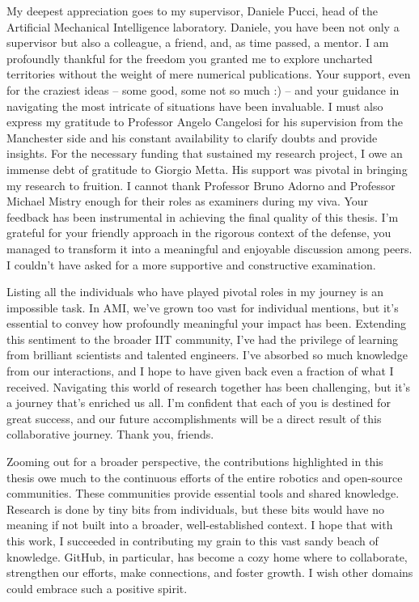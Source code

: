 \begin{addmargin}{-1.0cm}
My deepest appreciation goes to my supervisor, Daniele Pucci, head of the Artificial Mechanical Intelligence laboratory.
Daniele, you have been not only a supervisor but also a colleague, a friend, and, as time passed, a mentor.
I am profoundly thankful for the freedom you granted me to explore uncharted territories without the weight of mere numerical publications.
Your support, even for the craziest ideas -- some good, some not so much :) -- and your guidance in navigating the most intricate of situations have been invaluable.
I must also express my gratitude to Professor Angelo Cangelosi for his supervision from the Manchester side and his constant availability to clarify doubts and provide insights.
For the necessary funding that sustained my research project, I owe an immense debt of gratitude to Giorgio Metta.
His support was pivotal in bringing my research to fruition.
I cannot thank Professor Bruno Adorno and Professor Michael Mistry enough for their roles as examiners during my viva.
Your feedback has been instrumental in achieving the final quality of this thesis.
I'm grateful for your friendly approach in the rigorous context of the defense, you managed to transform it into a meaningful and enjoyable discussion among peers.
I couldn't have asked for a more supportive and constructive examination.

Listing all the individuals who have played pivotal roles in my journey is an impossible task.
In AMI, we've grown too vast for individual mentions, but it's essential to convey how profoundly meaningful your impact has been.
Extending this sentiment to the broader IIT community, I've had the privilege of learning from brilliant scientists and talented engineers.
I've absorbed so much knowledge from our interactions, and I hope to have given back even a fraction of what I received.
Navigating this world of research together has been challenging, but it's a journey that's enriched us all.
I'm confident that each of you is destined for great success, and our future accomplishments will be a direct result of this collaborative journey.
Thank you, friends.

Zooming out for a broader perspective, the contributions highlighted in this thesis owe much to the continuous efforts of the entire robotics and open-source communities. \linebreak
These communities provide essential tools and shared knowledge.
Research is done by tiny bits from individuals, but these bits would have no meaning if not built into a broader, well-established context.
I hope that with this work, I succeeded in contributing my grain to this vast sandy beach of knowledge.
GitHub, in particular, has become a cozy home where to collaborate, strengthen our efforts, make connections, and foster growth.
I wish other domains could embrace such a positive spirit.


\end{addmargin}
